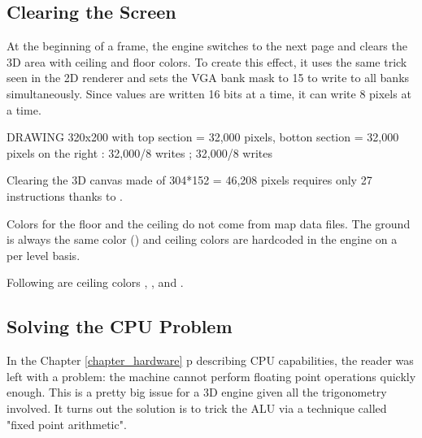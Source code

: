 \subsection{Clearing the Screen}
At the beginning of a frame, the engine switches to the next page and clears the 3D area with ceiling and floor colors. To create this effect, it uses the same trick seen in the 2D renderer and sets the VGA bank mask to 15 to write to all banks simultaneously. Since values are written 16 bits at a time, it can write 8 pixels at a time.\\ 
\par
DRAWING 320x200 with top section = 32,000 pixels, botton section = 32,000 pixels on the right : 32,000/8 writes ; 32,000/8 writes
\par
\begin{minipage}{\textwidth}
 
 \end{minipage}
\par
Clearing the 3D canvas made of 304*152 = 46,208 pixels requires only 27 instructions thanks to .\\
\par
Colors for the floor and the ceiling do not come from map data files. The ground is always the same color () and ceiling colors are hardcoded in the engine on a per level basis.\\
\par
\begin{minipage}{\textwidth}
 
 \end{minipage}
\par


Following are ceiling colors , ,  and .\\ 
\par
{}












\subsection{Solving the CPU Problem}

In the Chapter \ref{chapter_hardware}  p\pageref{chapter_hardware} describing CPU capabilities, the reader was left with a problem: the machine cannot perform floating point operations quickly enough. This is a pretty big issue for a 3D engine given all the trigonometry involved. It turns out the solution is to trick the ALU via a technique called "fixed point arithmetic".







